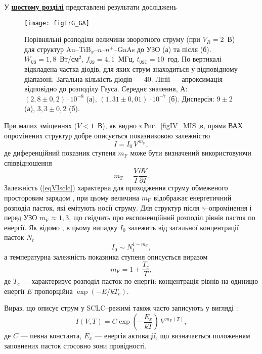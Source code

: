 \documentclass[a5paper,10pt,twoside,openany,article]{memoir} %
\begin{document}
У  \underline{\textbf{шостому розділі}} представлені результати досліджень


\begin{figure}
\center
\texttt{[image: figIrG\_GA]}%
\caption{\label{figIrG_GA}
Порівняльні розподіли величини зворотного струму (при $V_R=2$~В)
для структур Au--TiB$_x$--$n$--$n^+$--GaAs до УЗО (а) та після (б).
$W_\mathtt{US}=1,8$~Вт/см$^2$, $f_\mathtt{US}=4,1$~МГц, $t_\mathtt{UST}=10$~год.
По вертикалі відкладена частка діодів, для яких струм знаходиться у відповідному діапазоні.
Загальна кількість діодів --- 40.
Лінії --- апроксимація відповідно до розподілу Гауса.
Середнє значення, А:
$(2,8\pm0,2)\cdot10^{-8}$ (а),
$(1,31\pm0,01)\cdot10^{-7}$ (б).
Дисперсія:
$9\pm2$ (а),
$3,3\pm0,2$ (б).
}
\end{figure}

При малих зміщеннях ($V<1$~В), як видно з Рис.~\ref{figIV_MIS},в, пряма ВАХ опромінених структур добре описується показниковою залежністю
\begin{equation}\label{eqVIsclc}
  I=I_0\,V^{\,m_\mathrm{F}},
\end{equation}
де диференційний показник ступеня $m_\mathrm{F}$ може бути визначений використовуючи співвідношення
\begin{equation}\label{eqmsclc}
  m_\mathrm{F}=\frac{V}{I}\frac{\partial V}{\partial I}.
\end{equation}
Залежність (\ref{eqVIsclc}) характерна для проходження струму обмеженого просторовим зарядом \cite{Jafar}, при цьому величина $m_\mathrm{F}$ відображає енергетичний розподіл пасток, які емітують носії струму.
Для структур після $\gamma$--опромінення і перед УЗО $m_\mathrm{F}\approx1,3$, що свідчить про експоненційний розподіл рівнів пасток по енергії.
Як відомо \cite{Jafar}, в цьому випадку $I_0$ залежить від загальної концентрації пасток $N_t$
\begin{equation}\label{eqIoSCLC}
  I_0\sim N_t^{1-m_\mathrm{F}},
\end{equation}
а температурна залежність показника ступеня описується виразом
\begin{equation}\label{eqMT_IoSCLC}
  m_\mathrm{F}=1+\frac{T_c}{T},
\end{equation}
де
$T_c$ --- характеризує розподіл пасток по енергії:
концентрація рівнів на одиницю енергії $E$ пропорційна $\exp(-E/kT_c)$.

Вираз, що описує струм у SCLC--режимі також часто записують у вигляді \cite{Jafar}:
\begin{equation}\label{eqVIsclcT}
  I(V,T)=C\exp\left(-\frac{E_x}{kT}\right)\,V^{\,m_\mathrm{F}(T)},
\end{equation}
де
$C$ --- певна константа,
$E_x$ --- енергія активації, що визначається положенням заповнених пасток стосовно зони провідності.
\end{document}

